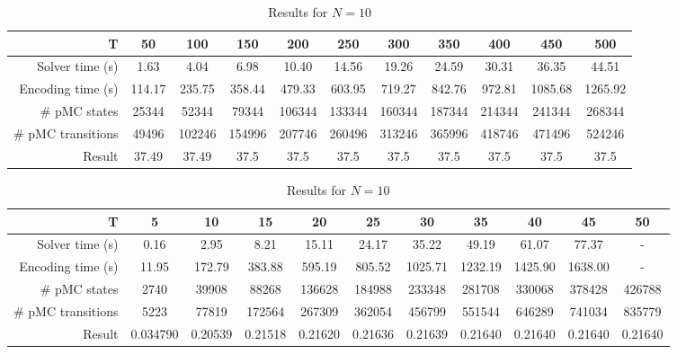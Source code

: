 \begin{sidewaystable}
\centering
\begin{tabular}{|r|c|c|c|c|c|c|c|c|c|c|}
\hline
T & 50 & 100 & 150 & 200 & 250 & 300 & 350 & 400 & 450 & 500 \\ \hline
Solver time (s) & 1.63 & 4.04 & 6.98 & 10.40 & 14.56 & 19.26 & 24.59 & 30.31 & 36.35 & 44.51 \\
Encoding time (s) & 114.17 & 235.75 & 358.44 & 479.33 & 603.95 & 719.27 & 842.76 & 972.81 & 1085.68 & 1265.92 \\
\# pMC states & 25344 & 52344 & 79344 & 106344 & 133344 & 160344 & 187344 & 214344 & 241344 & 268344 \\
\# pMC transitions & 49496 & 102246 & 154996 & 207746 & 260496 & 313246 & 365996 & 418746 & 471496 & 524246 \\
Result & 37.49 & 37.49 & 37.5 & 37.5 & 37.5 & 37.5 & 37.5 & 37.5 & 37.5 & 37.5 \\	 \hline
\end{tabular}
\caption{Results for $N=5$}


\vspace{2\baselineskip}
\begin{tabular}{|r|c|c|c|c|c|c|c|c|c|c|}
\hline
T & 5 & 10 & 15 & 20 & 25 & 30 & 35 & 40 & 45 & 50\\ \hline
Solver time (s) & 0.16 & 2.95 & 8.21 & 15.11 & 24.17 & 35.22 & 49.19 & 61.07 & 77.37 & - \\
Encoding time (s) & 
11.95 & 172.79 & 383.88 & 595.19 & 805.52 & 1025.71 & 1232.19 & 1425.90 & 1638.00 & - \\
\# pMC states & 2740 & 39908 & 88268 & 136628 & 184988 & 233348 & 281708 & 330068 & 378428 & 426788 \\
\# pMC transitions & 5223 & 77819 & 172564 & 267309 & 362054 & 456799 & 551544 & 646289 & 741034 & 835779 \\
Result & 
0.034790 & 0.20539 & 0.21518 & 0.21620 & 0.21636 & 0.21639 & 0.21640 & 0.21640 & 0.21640 & 0.21640 \\ \hline
\end{tabular}
\caption{Results for $N=10$}

\end{sidewaystable}

